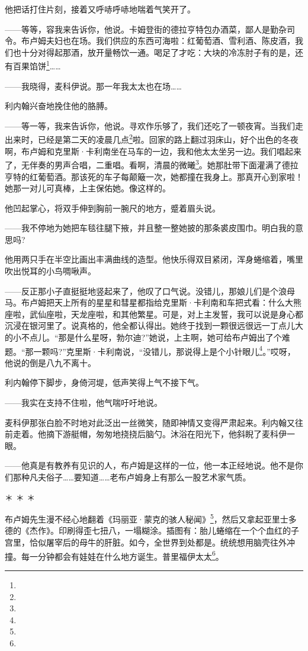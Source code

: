 \par 他把话打住片刻，接着又呼哧呼哧地喘着气笑开了。
\par ——等等，容我来告诉你，他说。卡姆登街的德拉亨特包办酒菜，鄙人是勤杂司令。布卢姆夫妇也在场。我们供应的东西可海啦：红葡萄酒、雪利酒、陈皮酒，我们也十分对得起那酒，放开量畅饮一通。喝足了才吃：大块的冷冻肘子有的是，还有百果馅饼\footnote{}……
\par ——我晓得，麦科伊说。那一年我太太也在场……
\par 利内翰兴奋地挽住他的胳膊。
\par ——等一等，我来告诉你，他说。寻欢作乐够了，我们还吃了一顿夜宵。当我们走出来时，已经是第二天的凌晨几点\footnote{}啦。回家的路上翻过羽床山，好个出色的冬夜啊，布卢姆和克里斯·卡利南坐在马车的一边，我和他太太坐另一边。我们唱起来了，无伴奏的男声合唱，二重唱。看啊，清晨的微曦\footnote{}。她那肚带下面灌满了德拉亨特的红葡萄酒。那该死的车子每颠簸一次，她都撞在我身上。那真开心到家啦！她那一对儿可真棒，上主保佑她。像这样的。
\par 他凹起掌心，将双手伸到胸前一腕尺的地方，蹙着眉头说。
\par ——我不停地为她把车毯往腿下掖，并且整一整她披的那条裘皮围巾。明白我的意思吗?
\par 他用两只手在半空比画出丰满曲线的造型。他快乐得双目紧闭，浑身蜷缩着，嘴里吹出悦耳的小鸟啁啾声。
\par ——反正那小子直挺挺地竖起来了，他叹了口气说。没错儿，那娘儿们是个浪母马。布卢姆把天上所有的星星和彗星都指给克里斯·卡利南和车把式看：什么大熊座啦，武仙座啦，天龙座啦，和其他繁星。可是，对上主发誓，我可以说是身心都沉浸在银河里了。说真格的，他全都认得出。她终于找到一颗很远很远一丁点儿大的小不点儿。“那是什么星呀，勃尔迪?”她说，上主啊，她可给布卢姆出了个难题。“那一颗吗?”克里斯·卡利南说，“没错儿，那说得上是个小针眼儿\footnote{}。”哎呀，他说的倒是八九不离十。
\par 利内翰停下脚步，身倚河堤，低声笑得上气不接下气。
\par ——我实在支持不住啦，他气喘吁吁地说。
\par 麦科伊那张白脸不时地对此泛出一丝微笑，随即神情又变得严肃起来。利内翰又往前走着。他摘下游艇帽，匆匆地挠挠后脑勺。沐浴在阳光下，他斜睨了麦科伊一眼。
\par ——他真是有教养有见识的人，布卢姆是这样的一位，他一本正经地说。他不是你们那种凡夫俗子……要知道……老布卢姆身上有那么一股艺术家气质。
\par ＊ ＊ ＊
\par 布卢姆先生漫不经心地翻着《玛丽亚·蒙克的骇人秘闻》\footnote{}，然后又拿起亚里士多德的《杰作》。印刷得歪七扭八，一塌糊涂。插图有：胎儿蜷缩在一个个血红的子宫里，恰似屠宰后的母牛的肝脏。如今，全世界到处都是。统统想用脑壳往外冲撞。每一分钟都会有娃娃在什么地方诞生。普里福伊太太\footnote{}。
